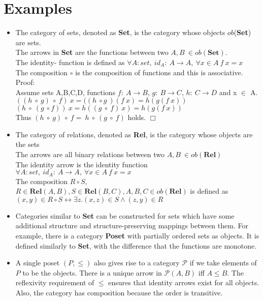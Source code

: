 \section {Examples}
\begin {itemize}

 \item The category of sets, denoted as \textbf{Set}, is the category whose objects $ob$(\textbf{Set}) are sets.
   \\ The arrows in \textbf{Set} are the functions between two $A,B\ \in ob(\textbf{Set}).$
   \\ The identity- function is defined as $\forall A: set, \ id_A:\ A \to A,\ \forall x \in A \ f \ x = x$
   \\ The composition $\circ$ is the composition of functions and this is associative. Proof:
   \\ Assume sets A,B,C,D, functions $f:\ A \to B$, $g:\ B \to C$, $h:\ C \to D$ and x $\in$ A.
   \\ $((h\ \circ \ g)\ \circ\ f)\ x = ((h \ \circ g \ )(f \ x) =h(g(f\  x)) $
   \\ $(h\ \circ \ (g \ \circ f))\ x = h ((g\ \circ \ f) \ x) = h(g(f \ x))$
   \\ Thus $(h\ \circ \ g)\ \circ \ f = \ h \ \circ \ (g \ \circ \ f)$ holds. $\Box$
 \item The category of relations, denoted as \textbf{Rel}, is the category whose objects are the sets
   \\The arrows are all binary relations between two $A,B \ \in ob(\textbf{Rel})$
   \\The identity arrow  is the identity function $\forall A: set, \ id_A:\ A \to A,\ \forall x \in A \ f \ x = x$
   \\ The composition $R \circ S$, $R  \in \textbf{Rel}(A,B), S \in \textbf{Rel}(B,C), A,B,C \in ob(\textbf{Rel})$ is defined as $ (x,y) \in  R \circ S \leftrightarrow \exists  z.(x,z) \in S \land (z,y) \in R$
   
  \item Categories similar to \textbf{Set} can be constructed for sets which have some additional structure and structure-preserving mappings between them. For example, there is a category \textbf{Poset} with partially ordered sets as objects. It is defined similarly to \textbf{Set}, with the difference that the functions are monotone. 
  
  \item A single poset $(P, \leq)$ also gives rise to a category $\mathscr{P}$ if we take elements of $P$ to be the objects. There is a unique arrow in $\mathscr{P}(A, B)$ iff $A \leq B$. The reflexivity requirement of $\leq$ ensures that identity arrows exist for all objects. Also, the category has composition because the order is transitive.
  

\end{itemize}
